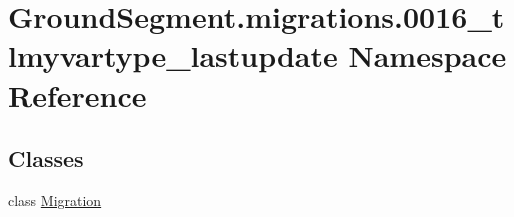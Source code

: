 \hypertarget{namespace_ground_segment_1_1migrations_1_10016__tlmyvartype__lastupdate}{}\section{Ground\+Segment.\+migrations.0016\+\_\+tlmyvartype\+\_\+lastupdate Namespace Reference}
\label{namespace_ground_segment_1_1migrations_1_10016__tlmyvartype__lastupdate}
\subsection*{Classes}
\begin{DoxyCompactItemize}
\item 
class \hyperlink{class_ground_segment_1_1migrations_1_10016__tlmyvartype__lastupdate_1_1_migration}{Migration}
\end{DoxyCompactItemize}
